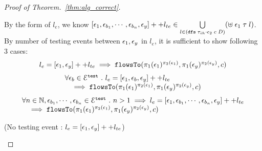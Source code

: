 \begin{proof}[Proof of Theorem.~\ref{thm:alg_correct}]
\begin{case}
\begin{subcase}[$\event_z \eventeq \event_1$]
%
By the form of $l_e$, we know
$[\mathtt{\epsilon}_1, \mathtt{\epsilon}_{b_1}, \cdots, \mathtt{\epsilon}_{b_n}, \mathtt{\epsilon}_y] ++ l_{te}  \in  
\bigcup\limits_{l \in (\mathtt{dfs} \; {\mathtt{\tau}_{ih} \cdot \mathtt{\epsilon}_2} \; c \; D) } (\uplus \; \mathtt{\epsilon}_1 \; \mathtt{\tau} \; l)$.
\\
By number of testing events between $\mathtt{\epsilon}_1, \mathtt{\epsilon}_y$ in $l_e$, it is sufficient to show following 3 cases:
\begin{equation}
\begin{array}{l}
  l_e = [\mathtt{\epsilon}_1, \mathtt{\epsilon}_y] ++ l_{te}
   \implies \mathtt{flowsTo}(\pi_1(\mathtt{\epsilon}_1)^{\pi_2(\mathtt{\epsilon}_1)}, \pi_1(\mathtt{\epsilon}_y)^{\pi_2(\mathtt{\epsilon}_y)}, c)
\end{array}
\end{equation}
%
\begin{equation}
  \begin{array}{l}
    \forall \mathtt{\epsilon}_b \in \mathcal{E}^{\mathtt{{test}}} ~.~ 
    l_e = [\mathtt{\epsilon}_1, \mathtt{\epsilon}_b, \mathtt{\epsilon}_y] ++ l_{te}
    \\ \quad
    \implies \mathtt{flowsTo}(\pi_1(\mathtt{\epsilon}_1)^{\pi_2(\mathtt{\epsilon}_1)}, \pi_1(\mathtt{\epsilon}_y)^{\pi_2(\mathtt{\epsilon}_y)}, c)
\end{array}
  \end{equation}
%
%
\begin{equation}
\begin{array}{l}
  \forall n \in \mathbb{N}, \mathtt{\epsilon}_{b_1}, \cdots, \mathtt{\epsilon}_{b_n} \in \mathcal{E}^{\mathtt{{test}}}~.~
   n > 1 \implies
   l_e = {[\mathtt{\epsilon}_1, \mathtt{\epsilon}_{b_1}, \cdots, \mathtt{\epsilon}_{b_n}, \mathtt{\epsilon}_y]} ++ l_{te}
   \\ \quad
  \implies \mathtt{flowsTo}(\pi_1(\mathtt{\epsilon}_1)^{\pi_2(\mathtt{\epsilon}_1)}, \pi_1(\mathtt{\epsilon}_y)^{\pi_2(\mathtt{\epsilon}_y)}, c)
\end{array}
\end{equation}
%
\begin{subsubcase}(No testing event : $l_e = [\mathtt{\epsilon}_1, \mathtt{\epsilon}_y] ++ l_{te}$)
\\

\end{subsubcase}
\end{subcase}
\end{case}
\end{proof}
